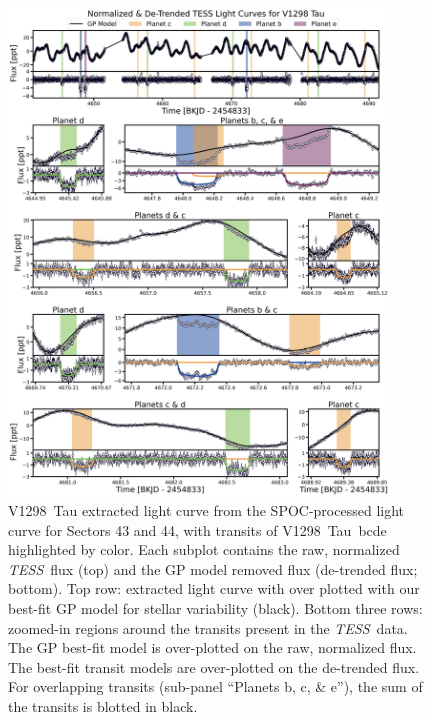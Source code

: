 \documentclass[twocolumn]{aastex631}
\newcommand{\githubicon}{{\color{black}\faGithub}}
\newcommand{\tess}{\textit{TESS}}
\newcommand{\sname}{V1298~Tau\xspace}
\newcommand{\allplanets}{V1298~Tau~bcde\xspace}
\begin{document}
\begin{figure}[hbtp]
\begin{center}
\includegraphics[width=0.9\textwidth,trim={0.25cm 0 0 0}]{static/transits.pdf}
\caption{\sname extracted light curve from the SPOC-processed light curve for Sectors 43 and 44, with transits of \allplanets highlighted by color. Each subplot contains the raw, normalized \tess\ flux (top) and the GP model removed flux (de-trended flux; bottom). Top row: extracted light curve with over plotted with our best-fit GP model for stellar variability (black). Bottom three rows: zoomed-in regions around the transits present in the \tess\ data. The GP best-fit model is over-plotted on the raw, normalized flux. The best-fit transit models are over-plotted on the de-trended flux. For overlapping transits (sub-panel ``Planets b, c, \& e''), the sum of the transits is blotted in black. \href{htt\
ps://github.com/afeinstein20/v1298tau\_tess/blob/main/src/figures/transits.py}{\githubicon}} \label{fig:transits}
\end{center}
\end{figure}
\end{document}
